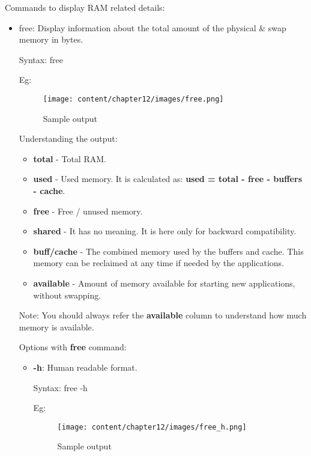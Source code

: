 \setlength{\columnsep}{3pt}
\begin{flushleft}
Commands to display RAM related details:
\begin{itemize}
	
	\item free: Display information about the total amount of the physical \& swap memory in bytes.
	
	\begin{tcolorbox}[breakable,notitle,boxrule=-0pt,colback=pink,colframe=pink]
		\color{black}
		\font=9pt
		Syntax: free
		\font=4pt
	\end{tcolorbox}
	Eg:
	\begin{figure}[h!]
		\centering
		\texttt{[image: content/chapter12/images/free.png]}
		\caption{Sample output}
		\label{fig:cpu1}
	\end{figure}
	
	Understanding the output:
	\begin{itemize}
		\item \textbf{total} - Total RAM.
		\item \textbf{used} - Used memory. It is calculated as: \textbf{used = total - free - buffers - cache}.
		\item \textbf{free} - Free / unused memory.
		\item \textbf{shared} - It has no meaning. It is here only for backward compatibility.
		\item \textbf{buff/cache} - The combined memory used by the buffers and cache. This memory can be reclaimed at any time if needed by the applications.
		\item \textbf{available} - Amount of memory available for starting new applications, without swapping.
	\end{itemize}
	\bigskip
	\begin{tcolorbox}[breakable,notitle,boxrule=-0pt,colback=yellow,colframe=yellow]
		\color{black}
		Note: You should always refer the \textbf{available} column to understand how much memory is available.
	\end{tcolorbox}
	\newpage
	
	Options with \textbf{free} command:
	\begin{itemize}
		\item \textbf{-h}: Human readable format.
		\bigskip
		\begin{tcolorbox}[breakable,notitle,boxrule=-0pt,colback=pink,colframe=pink]
			\color{black}
			\font=9pt
			Syntax: free -h
			\font=4pt
		\end{tcolorbox}
		Eg:
		\begin{figure}[h!]
			\centering
			\texttt{[image: content/chapter12/images/free\_h.png]}
			\caption{Sample output}
			\label{fig:free_h}
		\end{figure}


\end{itemize}
\end{itemize}
\end{flushleft}
